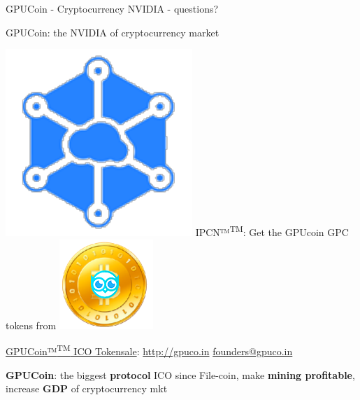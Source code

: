\documentclass[10pt,handout]{beamer}
\begin{document}
\begin{frame}[standout]{GPUCoin - Cryptocurrency NVIDIA - questions?}
\begin{center}
GPUCoin: the NVIDIA of cryptocurrency market 
\end{center}


\includegraphics[scale=.3]{static/ipcn-p2p}
IPCN™\textsuperscript{TM}: Get the GPUcoin GPC tokens from
\includegraphics[scale=0.3]{static/hootcoin} 


 \begin{center}
\href{https://j.mp/gpucoins}{GPUCoin™\textsuperscript{TM} ICO Tokensale}: 
\url{http://gpuco.in} 
\href{mailto:founders@gpuco.in}{founders@gpuco.in} 
 \end{center}
\begin{center}
\textbf{GPUCoin}: the biggest \textbf{protocol} ICO since File-coin, make \textbf{mining profitable}, increase \textbf{GDP} of cryptocurrency mkt 
\end{center}



 \begin{center}\ccbysa\end{center}

\end{frame}



 
\end{document}

